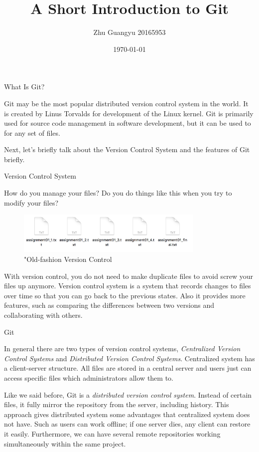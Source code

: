 \documentclass[12pt, a4papaer]{article}
\title{A Short Introduction to Git}
\author{Zhu Guangyu 20165953}
\date{\today}
\begin{document}
\maketitle

\begin{section}{What Is Git?}

Git may be the most popular distributed version control system in the world.
It is created by Linus Torvalds for development of the Linux kernel. Git is
primarily used for source code management in software development, but it can
be used to for any set of files.

Next, let's briefly talk about the Version Control System and the features of
Git briefly.

\begin{subsection}{Version Control System}

How do you manage your files? Do you do things like this when you try to modify
your files?
\begin{figure}[h]
    \centering
    \includegraphics[width=0.8\textwidth]{images/old-file-management}
    \caption{"Old-fashion Version Control}
\end{figure}

With version control, you do not need to make duplicate files to avoid screw
your files up anymore. Version control system is a system that records changes
to files over time so that you can go back to the previous states. Also it
provides more features, such as comparing the differences between two versions
and collaborating with others.

\end{subsection}

\begin{subsection}{Git}

In general there are two types of version control systems, \textit{Centralized Version
Control Systems} and \textit{Distributed Version Control Systems}. Centralized
system has a client-server structure. All files are stored in a central server
and users just can access specific files which administrators allow them to.

Like we said before, Git is a \textit{distributed version control system}.
Instead of certain files, it fully mirror the repository from the server,
including history. This approach gives distributed system some advantages that
centralized system does not have. Such as users can work offline; if one server
dies, any client can restore it easily. Furthermore, we can have several remote
repositories working simultaneously within the same project.
    
\end{subsection}
\end{section}
\newpage
\end{document}
